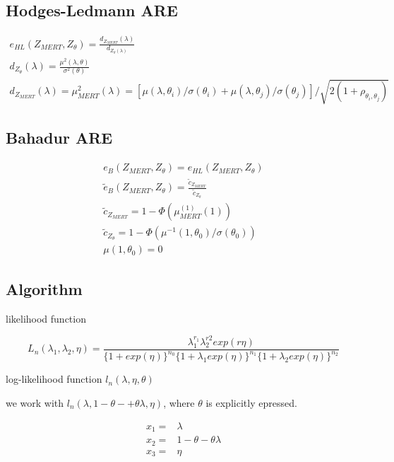 \documentclass{article}
\begin{document}
\subsection{Hodges-Ledmann ARE}

\begin{align*}
 e_{HL}(Z_{MERT},Z_{\theta}) =\frac{d_{Z_{MERT}}(\lambda)}{d_{Z_{\theta}(\lambda)}}\\
 d_{Z_\theta}(\lambda) =  \frac{\mu^2(\lambda,\theta)}{\sigma^2(\theta)}\\
 d_{Z_{MERT}}(\lambda) = \mu^2_{MERT}(\lambda)= [\mu(\lambda,\theta_i)/\sigma(\theta_i)+\mu(\lambda,\theta_j)/\sigma(\theta_j)]/\sqrt{2(1+\rho_{\theta_i,\theta_j})}
\end{align*}

\subsection{Bahadur ARE}

\begin{align*}
 e_{B}(Z_{MERT},Z_{\theta}) = e_{HL}(Z_{MERT},Z_{\theta})\\
 \tilde{e}_{B}(Z_{MERT},Z_{\theta}) = \frac{\tilde{c}_{Z_{MERT}}}{\tilde{c}_{Z_{\theta}}}\\
 \tilde{c}_{Z_{MERT}} = 1 - \Phi(\mu^{(1)}_{MERT}(1))\\
 \tilde{c}_{Z_{\theta}} = 1 - \Phi(\mu^{-1}(1,\theta_0)/\sigma(\theta_0))\\
 \mu(1,\theta_0) =0
\end{align*}


\subsection{Algorithm}
likelihood function

\begin{equation}
 L_n(\lambda_1,\lambda_2,\eta) = \frac{\lambda_1^{r_1}\lambda_2^{r2}exp(r\eta)}{\{1+exp(\eta)\}^{n_0}\{1+\lambda_1exp(\eta)\}^{n_1}\{1+\lambda_2exp(\eta)\}^{n_2}}
\end{equation}

log-likelihood function $l_n(\lambda,\eta,\theta)$

we work with $l_n(\lambda,1-\theta-+\theta\lambda,\eta)$, where $\theta$  is explicitly epressed.

\begin{align*}
x_1 = & \lambda\\
x_2= & 1-\theta-\theta\lambda\\
x_3 = & \eta
\end{align*}
\end{document}
